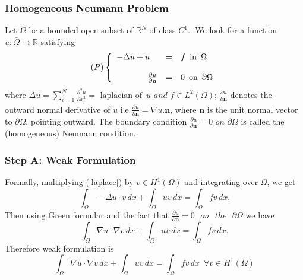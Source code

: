 \documentclass[7pt]{beamer}
\newcommand{\R}{\mathbb R}
\newcommand{\Om}{\Omega}
\begin{document}
\begin{frame}
 \frametitle{Homogeneous Neumann Problem}
Let  $\Om$ be a  bounded open subset of $\R^N$ of class $C^1.$. We look for a function
$u: \bar\Om\longrightarrow \R$ satisfying
\begin{eqnarray}
(P) \left \{
\begin{array}{lll}
-\Delta u + u &=& f\,\,\,\text{in}\,\,\,\Om\\
\\
\hspace*{1.3cm}\frac{\partial u}{\partial \textbf{n}} &=&0\,\,\,\text{on}\,\,\,\partial \Om
\end{array}
\right. \label{laplace}
\end{eqnarray}
where
$\Delta u = \sum_{i=1}^N\frac{\partial^2 u}{\partial x_i^2} = \,\,\text{laplacian of}\,\,\,u \,\,and\,\,f\in L^2(\Om)$; $\frac{\partial u}{\partial \textbf{n}}$ 
denotes the outward normal derivative of $u$ i.e $\frac{\partial u}{\partial \textbf{n}}= \nabla u. \textbf{n}$, where $\textbf{n}$ is the unit normal vector to $\partial\Om$,
pointing outward. The boundary condition $\frac{\partial u}{\partial \textbf{n}}=0 \,\,on\,\, \partial\Om$ is called the (homogeneous) Neumann condition.
\end{frame}
\begin{frame}
 \frametitle{Step A: Weak Formulation}
Formally, multiplying (\ref{laplace}) by $v\in H^1(\Om)$ and integrating over $\Om$, we get
$$\int_\Om-\Delta u\cdot v\,dx + \int_\Om uv\,dx = \int_\Om fv\,dx.$$
Then using Green formular and the fact that $\frac{\partial u}{\partial \textbf{n}} = 0 \,\,\,\,on \,\,\,\,the\,\,\,\, \partial \Om $  we have 
$$\int_\Om\nabla u\cdot\nabla v\,dx + \int_\Om uv\,dx = \int_\Om fv\,dx.$$
Therefore weak formulation is
$$\int_\Om\nabla u\cdot\nabla v\,dx + \int_\Om uv\,dx = \int_\Om fv\,dx \,\,\,\forall v\in H^1(\Om)$$
\end{frame}
\end{document}
